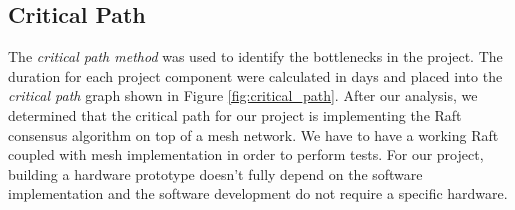 \documentclass[compsoc]{IEEEtran}
\begin{document}
\subsection{Critical Path}
The \emph{critical path method} was used to identify the bottlenecks in the project. The duration for each project component were calculated in days and placed into the \emph{critical path} graph shown in Figure \ref{fig:critical_path}. After our analysis, we determined that the critical path for our project is implementing the Raft consensus algorithm on top of a mesh network. We have to have a working Raft coupled with mesh implementation in order to perform tests. For our project, building a hardware prototype doesn't fully depend on the software implementation and the software development do not require a specific hardware.

\begin{figure}[ht]
    \centering
    
\end{figure}
\end{document}
